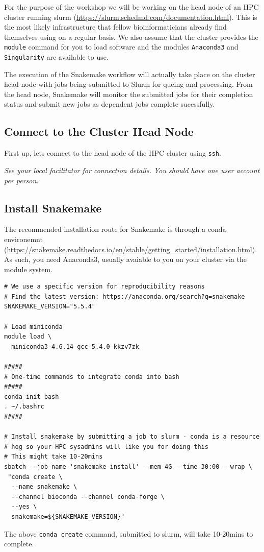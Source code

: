 For the purpose of the workshop we will be working on the head node of an HPC cluster running slurm (\url{https://slurm.schedmd.com/documentation.html}).
This is the most likely infrastructure that fellow bioinformaticians already find themselves using
on a regular basis. We also assume that the cluster provides the \texttt{module} command for you to
load software and the modules \texttt{Anaconda3} and \texttt{Singularity} are available to use.

The execution of the Snakemake workflow will actually take place on the cluster head node with jobs
being submitted to Slurm for queing and processing. From the head node, Snakemake will monitor the
submitted jobs for their completion status and submit new jobs as dependent jobs complete sucessfully.

\subsection{Connect to the Cluster Head Node}

\begin{steps}
First up, lets connect to the head node of the HPC cluster using \texttt{ssh}.

\emph{See your local facilitator for connection details. You should have one user account per person.}
\end{steps}

\subsection{Install Snakemake}

The recommended installation route for Snakemake is through a conda environemnt
(\url{https://snakemake.readthedocs.io/en/stable/getting_started/installation.html}). As such, you need
Anaconda3, usually avaiable to you on your cluster via the module system.

\begin{steps}
\begin{lstlisting}
# We use a specific version for reproducibility reasons
# Find the latest version: https://anaconda.org/search?q=snakemake
SNAKEMAKE_VERSION="5.5.4"

# Load miniconda
module load \
  miniconda3-4.6.14-gcc-5.4.0-kkzv7zk

#####
# One-time commands to integrate conda into bash
#####
conda init bash
. ~/.bashrc
#####

# Install snakemake by submitting a job to slurm - conda is a resource
# hog so your HPC sysadmins will like you for doing this
# This might take 10-20mins
sbatch --job-name 'snakemake-install' --mem 4G --time 30:00 --wrap \
 "conda create \
  --name snakemake \
  --channel bioconda --channel conda-forge \
  --yes \
  snakemake=${SNAKEMAKE_VERSION}"
\end{lstlisting}

The above \texttt{conda create} command, submitted to slurm, will take 10-20mins to complete. 

\end{steps}

